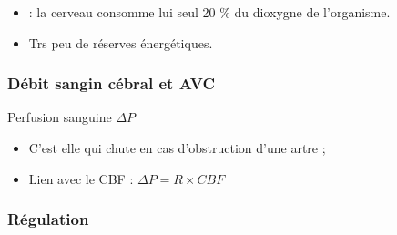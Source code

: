 \begin{frame}
\begin{itemize}
\item<+-> \cite{pat_neu} : la cerveau consomme  lui seul 20 \% du dioxygne de l'organisme.
\item<+-> Trs peu de r\'eserves \'energ\'etiques.
\end{itemize}
\end{frame}

\begin{frame}
\frametitle{D\'ebit sangin c\'ebral et AVC}
\begin{block}{Perfusion sanguine $\Delta P$}
\begin{itemize}
\item<+-> C'est elle qui chute en cas d'obstruction d'une artre ;
\item<+-> Lien avec le CBF : $\Delta P = R\times CBF$
\end{itemize}
\end{block}
\end{frame}

\begin{frame}
\frametitle{R\'egulation}



\end{frame}
